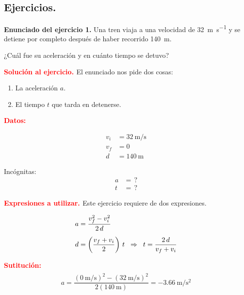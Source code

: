 \documentclass[14pt]{extarticle}
\newcommand{\textocolor}[2]{\textbf{\textcolor{#1}{#2}}}
\begin{document}
\subsection{Ejercicios.}

\noindent
\textbf{Enunciado del ejercicio 1. } Una tren viaja a una velocidad de \SI{32}{\meter\per\second} y se detiene por completo después de haber recorrido \SI{140}{\meter}. 

¿Cuál fue su aceleración y en cuánto tiempo se detuvo?

\textocolor{red}{Solución al ejercicio. } El enunciado nos pide dos cosas:
\begin{enumerate}
\item La aceleración $a$.
\item El tiempo $t$ que tarda en detenerse.
\end{enumerate}

\textocolor{red}{Datos:}

\vspace*{0.5cm}
\begin{minipage}[t]{0.4\linewidth}
\begin{align*}
v_{i} &= \SI{32}{\meter\per\second} \\[0.2em]
v_{f} &= 0 \\[0.2em]
d &= \SI{140}{\meter}
\end{align*}
\end{minipage}
\hspace{1cm}
\begin{minipage}[t]{0.4\linewidth}
Incógnitas:
\begin{align*}
a &= \, ? \\[0.2em]
t &= \, ?
\end{align*}
\end{minipage}

\textocolor{red}{Expresiones a utilizar. } Este ejercicio requiere de dos expresiones.
 
\begin{eqnarray*}
\begin{aligned}
a &= \dfrac{v_{f}^{2} - v_{i}^{2}}{2 \, d} \\[0.5em] 
d &= \left( \dfrac{v_{f} + v_{i}}{2} \right) \, t  \hspace{0.2cm} \Rightarrow \hspace*{0.2cm} t = \dfrac{2 \, d}{v_{f} + v_{i}}
\end{aligned}
\end{eqnarray*}

\textocolor{red}{Sutitución:}
\begin{eqnarray*}
\begin{aligned}
a = \dfrac{ \left( \SI{0}{\meter\per\second} \right)^{2} - \left( \SI{32}{\meter\per\second} \right)^{2} }{2 ( \SI{140}{\meter})} = - \SI{3.66}{\meter\per\square\second}
\end{aligned}
\end{eqnarray*}
\end{document}
